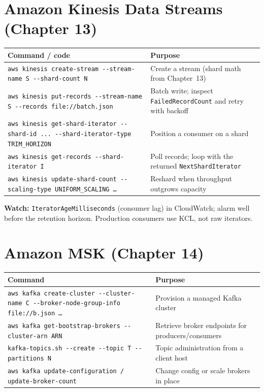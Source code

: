 \section{Amazon Kinesis Data Streams (Chapter 13)}
%

\begin{center}
\footnotesize
\begin{tabular}{@{}p{7.2cm}p{7.6cm}@{}}
\toprule
\textbf{Command / code} & \textbf{Purpose} \\
\midrule
\texttt{aws kinesis create-stream -{}-stream-name S -{}-shard-count N} & Create a stream (shard math from Chapter~13) \\
\texttt{aws kinesis put-records -{}-stream-name S -{}-records file://batch.json} & Batch write; inspect \texttt{FailedRecordCount} and retry with backoff \\
\texttt{aws kinesis get-shard-iterator -{}-shard-id ... -{}-shard-iterator-type TRIM\_HORIZON} & Position a consumer on a shard \\
\texttt{aws kinesis get-records -{}-shard-iterator I} & Poll records; loop with the returned \texttt{NextShardIterator} \\
\texttt{aws kinesis update-shard-count -{}-scaling-type UNIFORM\_SCALING \dots} & Reshard when throughput outgrows capacity \\
\bottomrule
\end{tabular}
\end{center}

\noindent\textbf{Watch:} \texttt{IteratorAgeMilliseconds} (consumer lag) in CloudWatch; alarm well
before the retention horizon. Production consumers use KCL, not raw iterators.

\section{Amazon MSK (Chapter 14)}
%

\begin{center}
\footnotesize
\begin{tabular}{@{}p{7.2cm}p{7.6cm}@{}}
\toprule
\textbf{Command} & \textbf{Purpose} \\
\midrule
\texttt{aws kafka create-cluster -{}-cluster-name C -{}-broker-node-group-info file://b.json \dots} & Provision a managed Kafka cluster \\
\texttt{aws kafka get-bootstrap-brokers -{}-cluster-arn ARN} & Retrieve broker endpoints for producers/consumers \\
\texttt{kafka-topics.sh -{}-create -{}-topic T -{}-partitions N} & Topic administration from a client host \\
\texttt{aws kafka update-configuration / update-broker-count} & Change config or scale brokers in place \\
\bottomrule
\end{tabular}
\end{center}

